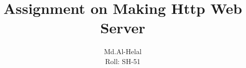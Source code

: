 \documentclass{article}
\begin{document}
\title{Assignment on Making Http Web Server}
\author{Md.Al-Helal\\Roll: SH-51}
\maketitle

\end{document}
